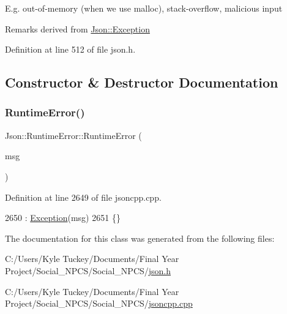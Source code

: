 E.\+g. out-\/of-\/memory (when we use malloc), stack-\/overflow, malicious input

\begin{DoxyRemark}{Remarks}
derived from \hyperlink{class_json_1_1_exception}{Json\+::\+Exception} 
\end{DoxyRemark}


Definition at line 512 of file json.\+h.



\subsection{Constructor \& Destructor Documentation}
\mbox{\label{class_json_1_1_runtime_error_a0f6445dc345ce0a703610b6e893fee40}} 
\subsubsection{\texorpdfstring{Runtime\+Error()}{RuntimeError()}}
{\footnotesize\ttfamily Json\+::\+Runtime\+Error\+::\+Runtime\+Error (\begin{DoxyParamCaption}\item[{\hyperlink{json_8h_a1e723f95759de062585bc4a8fd3fa4be}{J\+S\+O\+N\+C\+P\+P\+\_\+\+S\+T\+R\+I\+NG} const \&}]{msg }\end{DoxyParamCaption})}



Definition at line 2649 of file jsoncpp.\+cpp.


\begin{DoxyCode}
2650   : \hyperlink{class_json_1_1_exception_ae764aa42e0755bd4ce9d303e2733fa8f}{Exception}(msg)
2651 \{\}
\end{DoxyCode}


The documentation for this class was generated from the following files\+:\begin{DoxyCompactItemize}
\item 
C\+:/\+Users/\+Kyle Tuckey/\+Documents/\+Final Year Project/\+Social\+\_\+\+N\+P\+C\+S/\+Social\+\_\+\+N\+P\+C\+S/\hyperlink{json_8h}{json.\+h}\item 
C\+:/\+Users/\+Kyle Tuckey/\+Documents/\+Final Year Project/\+Social\+\_\+\+N\+P\+C\+S/\+Social\+\_\+\+N\+P\+C\+S/\hyperlink{jsoncpp_8cpp}{jsoncpp.\+cpp}\end{DoxyCompactItemize}
